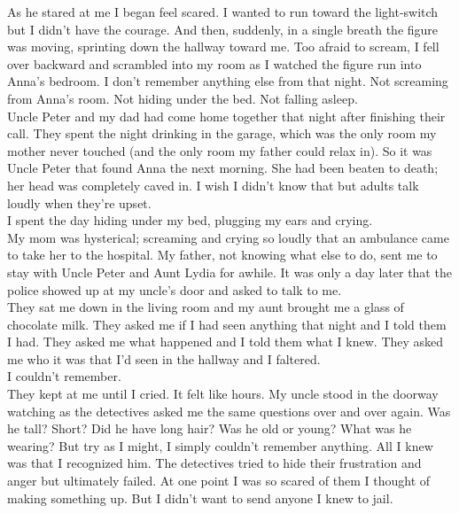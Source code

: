 \documentclass[a5paper]{scrartcl}
\begin{document}
As he stared at me I began feel scared. I wanted to run toward the light-switch but I didn't have the courage. And then, suddenly, in a single breath the figure was moving, sprinting down the hallway toward me.  Too afraid to scream, I fell over backward and scrambled into my room as I watched the figure run into Anna's bedroom. I don't remember anything else from that night. Not screaming from Anna's room. Not hiding under the bed. Not falling asleep. \\


Uncle Peter and my dad had come home together that night after finishing their call. They spent the night drinking in the garage, which was the only room my mother never touched (and the only room my father could relax in). So it was Uncle Peter that found Anna the next morning. She had been beaten to death; her head was completely caved in. I wish I didn't know that but adults talk loudly when they're upset. \\


I spent the day hiding under my bed, plugging my ears and crying.\\


My mom was hysterical; screaming and crying so loudly that an ambulance came to take her to the hospital. My father, not knowing what else to do, sent me to stay with Uncle Peter and Aunt Lydia for awhile. It was only a day later that the police showed up at my uncle's door and asked to talk to me.\\


They sat me down in the living room and my aunt brought me a glass of chocolate milk. They asked me if I had seen anything that night and I told them I had. They asked me what happened and I told them what I knew. They asked me who it was that I'd seen in the hallway and I faltered. \\


I couldn't remember.\\


They kept at me until I cried. It felt like hours. My uncle stood in the doorway watching as the detectives asked me the same questions over and over again. Was he tall? Short? Did he have long hair? Was he old or young? What was he wearing? But try as I might, I simply couldn't remember anything. All I knew was that I recognized him. The detectives tried to hide their frustration and anger but ultimately failed. At one point I was so scared of them I thought of making something up. But I didn't want to send anyone I knew to jail.\\
\end{document}
